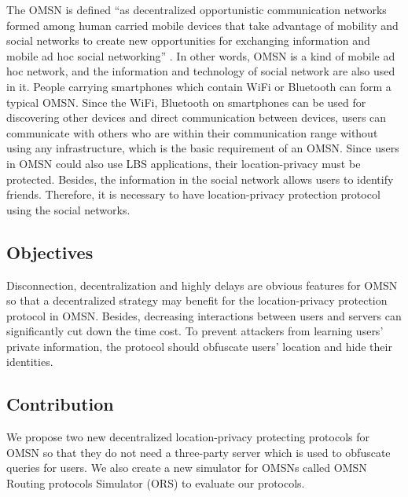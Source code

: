 The OMSN is defined ``as decentralized opportunistic communication networks formed among human carried mobile devices that take advantage of mobility and social networks to create new opportunities for exchanging information and mobile ad hoc social networking'' \cite {C2}. In other words, OMSN is a kind of mobile ad hoc network, and the information and technology of social network are also used in it. People carrying smartphones which contain WiFi or Bluetooth can form a typical OMSN. Since the WiFi, Bluetooth on smartphones can be used for discovering other devices and direct communication between devices, users can communicate with others who are within their communication range without using any infrastructure, which is the basic requirement of an OMSN. Since users in OMSN could also use LBS applications, their location-privacy must be protected. Besides, the information in the social network allows users to identify friends. Therefore, it is necessary to have location-privacy protection protocol using the social networks.


\subsection{ Objectives}

\noindent Disconnection, decentralization and highly delays are obvious features for OMSN so that a decentralized strategy may benefit for the location-privacy protection protocol in OMSN. Besides, decreasing interactions between users and servers can significantly cut down the time cost. To prevent attackers from learning users' private information, the protocol should obfuscate users' location and hide their identities.


\subsection{ Contribution}

\noindent We propose two new decentralized location-privacy protecting protocols for OMSN so that they do not need a three-party server which is used to obfuscate queries for users. We also create a new simulator for OMSNs called OMSN Routing protocols Simulator (ORS) to evaluate our protocols.

